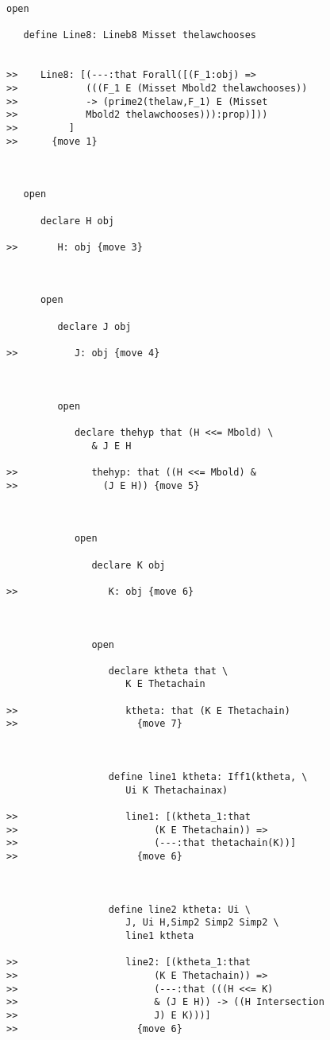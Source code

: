 \documentclass[12pt]{article}
\begin{document}
\begin{verbatim}
open

   define Line8: Lineb8 Misset thelawchooses


>>    Line8: [(---:that Forall([(F_1:obj) =>
>>            (((F_1 E (Misset Mbold2 thelawchooses))
>>            -> (prime2(thelaw,F_1) E (Misset
>>            Mbold2 thelawchooses))):prop)]))
>>         ]
>>      {move 1}



   open

      declare H obj

>>       H: obj {move 3}



      open

         declare J obj

>>          J: obj {move 4}



         open

            declare thehyp that (H <<= Mbold) \
               & J E H

>>             thehyp: that ((H <<= Mbold) &
>>               (J E H)) {move 5}



            open

               declare K obj

>>                K: obj {move 6}



               open

                  declare ktheta that \
                     K E Thetachain

>>                   ktheta: that (K E Thetachain)
>>                     {move 7}



                  define line1 ktheta: Iff1(ktheta, \
                     Ui K Thetachainax)

>>                   line1: [(ktheta_1:that
>>                        (K E Thetachain)) =>
>>                        (---:that thetachain(K))]
>>                     {move 6}



                  define line2 ktheta: Ui \
                     J, Ui H,Simp2 Simp2 Simp2 \
                     line1 ktheta

>>                   line2: [(ktheta_1:that
>>                        (K E Thetachain)) =>
>>                        (---:that (((H <<= K)
>>                        & (J E H)) -> ((H Intersection
>>                        J) E K)))]
>>                     {move 6}




\end{verbatim}
\end{document}
